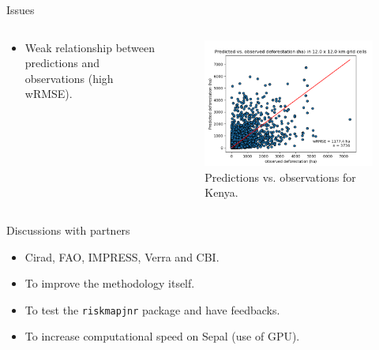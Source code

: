 \documentclass[10pt,table,dvipsnames,compress]{beamer}
\begin{document}
\begin{frame}[label={sec:org775fcfe}]{Issues}
\begin{columns}
\begin{column}{0.5\columnwidth}
\begin{itemize}
\item Weak relationship between predictions and observations (high wRMSE).
\end{itemize}
\end{column}

\begin{column}{0.5\columnwidth}
\begin{figure}[htbp]
\centering
\includegraphics[width=\textwidth]{figs/pred_obs_kenya.png}
\caption{\label{fig:org81afec7}Predictions vs. observations for Kenya.}
\end{figure}
\end{column}
\end{columns}
\end{frame}

\begin{frame}[label={sec:org44f56a4},fragile]{Discussions with partners}
 \begin{itemize}
\item Cirad, FAO, IMPRESS, Verra and CBI.
\item To improve the methodology itself.
\item To test the \texttt{riskmapjnr} package and have feedbacks.
\item To increase computational speed on Sepal (use of GPU).
\end{itemize}
\end{frame}
\end{document}
